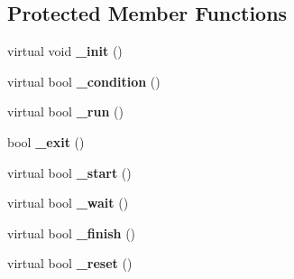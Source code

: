 \subsection*{Protected Member Functions}
\begin{DoxyCompactItemize}
\item 
\hypertarget{class_watcher_1_1_debugger_1_1_watcher_rule_ad13a5a5da6a643d01cc1abb4f4b3fe87}{virtual void {\bfseries \+\_\+init} ()}\label{class_watcher_1_1_debugger_1_1_watcher_rule_ad13a5a5da6a643d01cc1abb4f4b3fe87}

\item 
\hypertarget{class_watcher_1_1_debugger_1_1_watcher_rule_a6661514662a9658dd88e8e69a93a29ad}{virtual bool {\bfseries \+\_\+condition} ()}\label{class_watcher_1_1_debugger_1_1_watcher_rule_a6661514662a9658dd88e8e69a93a29ad}

\item 
\hypertarget{class_watcher_1_1_debugger_1_1_watcher_rule_a056964d4bcd75e9406f3a4d9576ca919}{virtual bool {\bfseries \+\_\+run} ()}\label{class_watcher_1_1_debugger_1_1_watcher_rule_a056964d4bcd75e9406f3a4d9576ca919}

\item 
\hypertarget{class_watcher_1_1_debugger_1_1_watcher_rule_ae43f448ca83550f24b80a11dd9372ee1}{bool {\bfseries \+\_\+exit} ()}\label{class_watcher_1_1_debugger_1_1_watcher_rule_ae43f448ca83550f24b80a11dd9372ee1}

\item 
\hypertarget{class_watcher_1_1_debugger_1_1_watcher_rule_a3f03b217ae7bae64d7ed2ae08b0fecd5}{virtual bool {\bfseries \+\_\+start} ()}\label{class_watcher_1_1_debugger_1_1_watcher_rule_a3f03b217ae7bae64d7ed2ae08b0fecd5}

\item 
\hypertarget{class_watcher_1_1_debugger_1_1_watcher_rule_a5f9ddd7beb32242d040a24abcb018093}{virtual bool {\bfseries \+\_\+wait} ()}\label{class_watcher_1_1_debugger_1_1_watcher_rule_a5f9ddd7beb32242d040a24abcb018093}

\item 
\hypertarget{class_watcher_1_1_debugger_1_1_watcher_rule_ad8688c50628e7db82c50a119b97218c1}{virtual bool {\bfseries \+\_\+finish} ()}\label{class_watcher_1_1_debugger_1_1_watcher_rule_ad8688c50628e7db82c50a119b97218c1}

\item 
\hypertarget{class_watcher_1_1_debugger_1_1_watcher_rule_a9344a38274c2fbcfca9777513add7118}{virtual bool {\bfseries \+\_\+reset} ()}\label{class_watcher_1_1_debugger_1_1_watcher_rule_a9344a38274c2fbcfca9777513add7118}


\end{DoxyCompactItemize}
